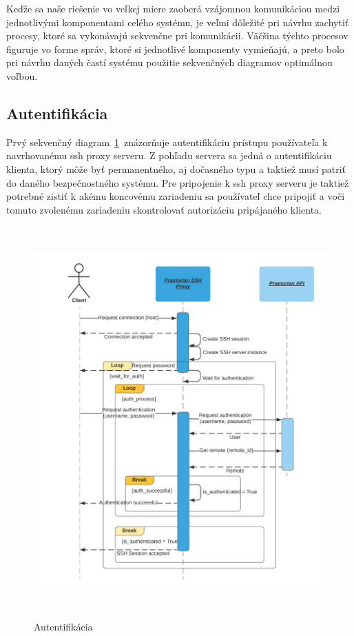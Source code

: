 Keďže sa naše riešenie vo veľkej miere zaoberá vzájomnou komunikáciou medzi jednotlivými komponentami celého systému, je
veľmi dôležité pri návrhu zachytiť procesy, ktoré sa vykonávajú sekvenčne pri komunikácii.
Väčšina týchto procesov figuruje vo forme správ, ktoré si jednotlivé komponenty vymieňajú, a preto bolo pri návrhu daných
častí systému použitie sekvenčných diagramov optimálnou voľbou.

\subsection{Autentifikácia}\label{subsec:sek-autentifikacia}

Prvý sekvenčný diagram~\ref{fig:obr_10}~znázorňuje autentifikáciu prístupu používateľa k navrhovanému ssh proxy serveru.
Z pohľadu servera sa jedná o autentifikáciu klienta, ktorý môže byť permanentného, aj dočasného typu a taktiež musí patriť
do daného bezpečnostného systému.
Pre pripojenie k ssh proxy serveru je taktiež potrebné zistiť k akému koncovému zariadeniu sa používateľ chce pripojiť a
voči tomuto zvolenému zariadeniu skontrolovať autorizáciu pripájaného klienta.

\begin{figure}[H]
\begin{center}\includegraphics[width=\textwidth,height=15cm,keepaspectratio=true]{assets/sequence_diagram_auth.png}\end{center}
\caption[Autentifikácia]{Autentifikácia}\label{fig:obr_10}
\end{figure}

